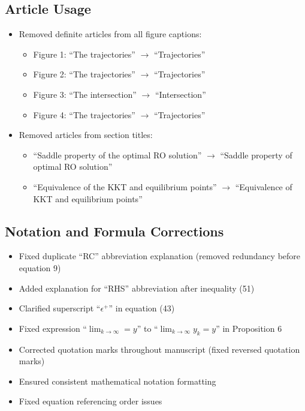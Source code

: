 \documentclass[11pt]{article}
\begin{document}
\subsection{Article Usage}
\begin{itemize}
\item Removed definite articles from all figure captions:
  \begin{itemize}
  \item Figure 1: ``The trajectories'' $\rightarrow$ ``Trajectories''
  \item Figure 2: ``The trajectories'' $\rightarrow$ ``Trajectories''
  \item Figure 3: ``The intersection'' $\rightarrow$ ``Intersection''
  \item Figure 4: ``The trajectories'' $\rightarrow$ ``Trajectories''
  \end{itemize}
\item Removed articles from section titles:
  \begin{itemize}
  \item ``Saddle property of the optimal RO solution'' $\rightarrow$ ``Saddle property of optimal RO solution''
  \item ``Equivalence of the KKT and equilibrium points'' $\rightarrow$ ``Equivalence of KKT and equilibrium points''
  \end{itemize}
\end{itemize}

\subsection{Notation and Formula Corrections}
\begin{itemize}
\item Fixed duplicate ``RC'' abbreviation explanation (removed redundancy before equation 9)
\item Added explanation for ``RHS'' abbreviation after inequality (51)
\item Clarified superscript ``$\epsilon^+$'' in equation (43)
\item Fixed expression ``$\lim_{k \to \infty}=y$'' to ``$\lim_{k \to \infty} y_k=y$'' in Proposition 6
\item Corrected quotation marks throughout manuscript (fixed reversed quotation marks)
\item Ensured consistent mathematical notation formatting
\item Fixed equation referencing order issues
\end{itemize}
\end{document}
